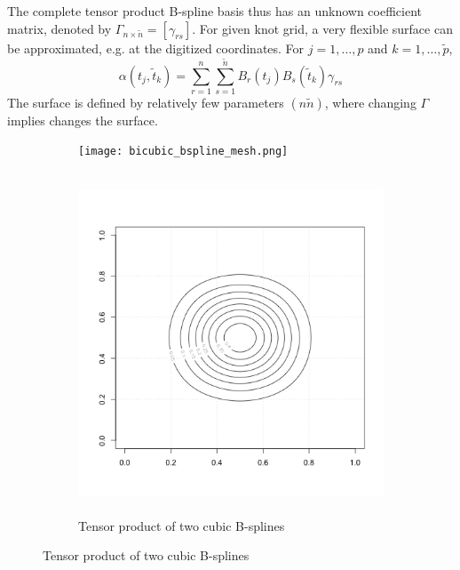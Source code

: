 \documentclass[12pt]{article}
\begin{document}
The complete tensor product B-spline basis thus has an unknown coefficient matrix, denoted by $\Gamma_{n\times\tilde{n}} = \left[\gamma_{rs}\right]$. For given knot grid, a very flexible surface can be approximated, e.g. at the digitized coordinates. For $j=1,\dots,p$ and $k=1,\dots,\tilde{p}$,
\begin{equation} \label{eq:coefficient_surface_expansion}
\alpha\left(t_{j}, \tilde{t}_{k}\right) = \sum_{r=1}^n \sum_{s=1}^{\tilde{n}}  B_r\left(t_{j}\right) B_s\left(\tilde{t}_{k}\right) \gamma_{rs}
\end{equation}
\noindent
The surface is defined by relatively few parameters $\left(n \tilde{n} \right)$, where changing $\Gamma$ implies changes the surface.

\begin{figure}[H]
\begin{subfigure}
  \centering
 \graphicspath{{img/}}
  \texttt{[image: bicubic\_bspline\_mesh.png]}
  \label{fig:bicubic_bspline}
\end{subfigure}

\begin{subfigure}
  \centering
  \graphicspath{{img/}}
  \includegraphics[width=4in, height=4in]{bicubic_bspline_contour.png}
  \caption{Tensor product of two cubic B-splines}\label{fig:bicubic_bspline_contour}
\end{subfigure}
\label{fig:bicubic_BS}
\end{figure}

\end{document}
